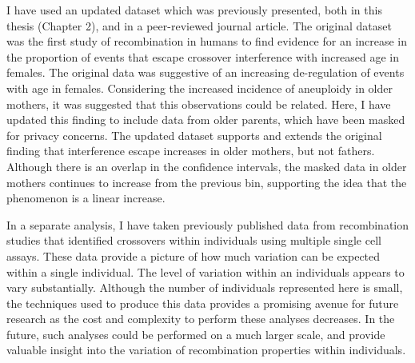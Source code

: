 I have used an updated dataset which was previously presented, both in this thesis (Chapter 2), and in a peer-reviewed journal article\cite{Campbell2015}.
The original dataset was the first study of recombination in humans to find evidence for an increase in the proportion of events that escape crossover interference with increased age in females.
The original data was suggestive of an increasing de-regulation of events with age in females.
Considering the increased incidence of aneuploidy in older mothers\cite{Hassold2001}, it was suggested that this observations could be related.
Here, I have updated this finding to include data from older parents, which have been masked for privacy concerns.
The updated dataset supports and extends the original finding that interference escape increases in older mothers, but not fathers.
Although there is an overlap in the confidence intervals, the masked data in older mothers continues to increase from the previous bin, supporting the idea that the phenomenon is a linear increase.

In a separate analysis, I have taken previously published data from recombination studies that identified crossovers within individuals using multiple single cell assays.
These data provide a picture of how much variation can be expected within a single individual.
The level of variation within an individuals appears to vary substantially.
Although the number of individuals represented here is small, the techniques used to produce this data provides a promising avenue for future research as the cost and complexity to perform these analyses decreases.
In the future, such analyses could be performed on a much larger scale, and provide valuable insight into the variation of recombination properties within individuals.

\clearpage
\renewcommand{\bibname}{References}
\begingroup
    \setlength{\bibsep}{10pt}
    \linespread{1}\selectfont
    
\endgroup




